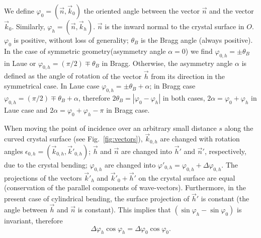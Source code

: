\documentclass[preprint]{iucr}              %
\newcommand{\inred}[1]{{\color{red}#1}}
\begin{document}
We \inred{define $\varphi_0 = (\vec n, \vec k_0)$ the oriented angle between the vector $\vec n$ and the vector $\vec k_0$. Similarly,} $\varphi_h = (\vec n, \vec k_h)$. $\vec n$ is the inward normal to the crystal surface \inred{in $O$}. $\varphi_0$ is positive, without loss of generality; $\theta_B$ is the Bragg angle \inred{(always positive)}.
\inred{In the}  case of symmetric geometry(asymmetry angle $\alpha=0$) \inred{we find} $\varphi_{0,h}=\pm\theta_B$ in Laue or $\varphi_{0,h}=(\pi/2)\mp\theta_B$ in Bragg. Otherwise, the asymmetry angle $\alpha$ is defined as the angle of rotation \inred{of the vector $\vec h$ from its direction in the symmetrical case}. 
In Laue case $\varphi_{0,h}=\pm\theta_B+\alpha$; in Bragg case $\varphi_{0,h}=(\pi/2)\mp\theta_B+\alpha$, therefore $2\theta_B=|\varphi_0-\varphi_h|$ in both cases, $2\alpha=\varphi_0+\varphi_h$ in Laue case and $2\alpha=\varphi_0+\varphi_h-\pi$ in Bragg case.


When moving the point of incidence over an arbitrary small distance $s$ along the curved crystal surface (see Fig.~\ref{fig:vectors}), 
$\vec k_{0,h}$ are changed
with rotation angles $\epsilon_{0,h} = (\vec k_{0,h},\vec k'_{0,h})$; $\vec h$ and $\vec n$ are changed into $\vec h'$ and $\vec n'$, respectively, due to the crystal bending;
$\varphi_{0,h}$ are changed into $\varphi'_{0,h}=\varphi_{0,h}+\Delta \varphi_{0,h}$.
The projections of the vectors $\vec k'_{h}$ and $\vec k'_{0}+\vec h'$ on the crystal surface are equal \inred{(}conservation of the parallel components of wave-vectors\inred{)}.
Furthermore, in the present case of cylindrical bending, the surface projection of $\vec h'$ is constant (the angle between $\vec h$ and $\vec n$ is constant).
This implies that $(\sin \varphi_h - \sin \varphi_0)$ is invariant, therefore
\begin{equation}
\label{eq:invariant}
    \Delta \varphi_h \cos\varphi_h = \Delta \varphi_0 \cos\varphi_0.
\end{equation}
\end{document}
